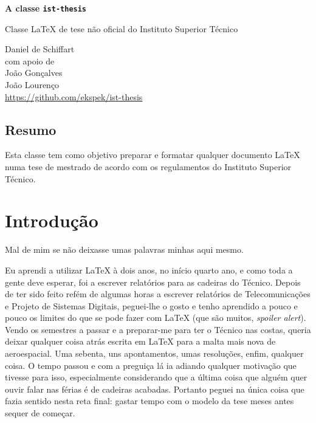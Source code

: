 \documentclass{ist-thesis}
\begin{document}
\begin{center}
	{\Huge\bfseries A classe \texttt{ist-thesis}}
	\par\bigskip
	{\Large Classe \LaTeX{} de tese não oficial do Instituto Superior Técnico}
	\par\bigskip\smallskip
	Daniel de Schiffart \\
	{\small com apoio de} \\
	João Gonçalves \\
	João Lourenço \bigskip \\
	\url{https://github.com/ekspek/ist-thesis}
\end{center}

\bigskip\bigskip

\begin{center}
	\section*{Resumo}
\end{center}
Esta classe tem como objetivo preparar e formatar qualquer documento \LaTeX{} numa tese de mestrado de acordo com os regulamentos do Instituto Superior Técnico.

\tableofcontents

\clearpage

\section*{Introdução}

Mal de mim se não deixasse umas palavras minhas aqui mesmo.

Eu aprendi a utilizar \LaTeX{} à dois anos, no início quarto ano, e como toda a gente deve esperar, foi a escrever relatórios para as cadeiras do Técnico. Depois de ter sido feito refém de algumas horas a escrever relatórios de Telecomunicações e Projeto de Sistemas Digitais, peguei-lhe o gosto e tenho aprendido a pouco e pouco os limites do que se pode fazer com \LaTeX{} (que são muitos, \textit{spoiler alert}). Vendo os semestres a passar e a preparar-me para ter o Técnico nas costas, queria deixar qualquer coisa atrás escrita em \LaTeX{} para a malta mais nova de aeroespacial. Uma sebenta, uns apontamentos, umas resoluções, enfim, qualquer coisa. O tempo passou e com a preguiça lá ia adiando qualquer motivação que tivesse para isso, especialmente considerando que a última coisa que alguém quer ouvir falar nas férias é de cadeiras acabadas. Portanto peguei na única coisa que fazia sentido nesta reta final: gastar tempo com o modelo da tese meses antes sequer de começar.
\end{document}
